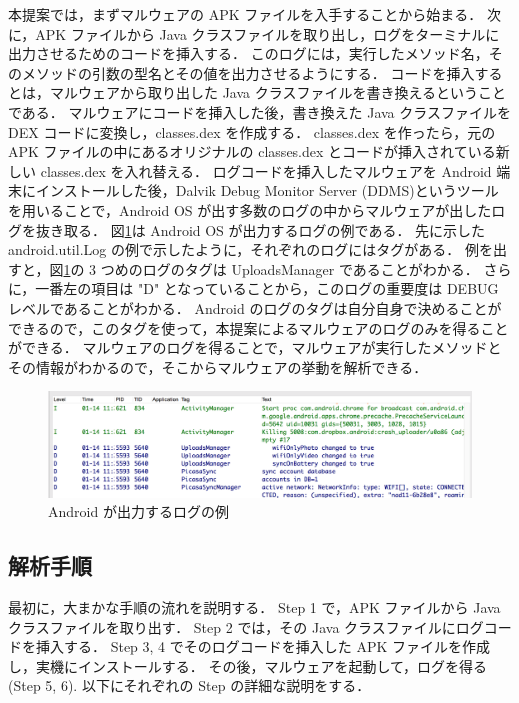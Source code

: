 本提案では，まずマルウェアの APK ファイルを入手することから始まる．
次に，APK ファイルから Java クラスファイルを取り出し，ログをターミナルに出力させるためのコードを挿入する．
このログには，実行したメソッド名，そのメソッドの引数の型名とその値を出力させるようにする．
コードを挿入するとは，マルウェアから取り出した Java クラスファイルを書き換えるということである．
マルウェアにコードを挿入した後，書き換えた Java クラスファイルを DEX コードに変換し，classes.dex を作成する．
classes.dex を作ったら，元の APK ファイルの中にあるオリジナルの classes.dex とコードが挿入されている新しい classes.dex を入れ替える．
ログコードを挿入したマルウェアを Android 端末にインストールした後，Dalvik Debug Monitor Server (DDMS)というツールを用いることで，Android OS が出す多数のログの中からマルウェアが出したログを抜き取る．
図\ref{examplelog}は Android OS が出力するログの例である．
先に示した android.util.Log の例で示したように，それぞれのログにはタグがある．
例を出すと，図\ref{examplelog}の 3 つめのログのタグは UploadsManager であることがわかる．
さらに，一番左の項目は "D"  となっていることから，このログの重要度は DEBUG レベルであることがわかる．
Android のログのタグは自分自身で決めることができるので，このタグを使って，本提案によるマルウェアのログのみを得ることができる．
マルウェアのログを得ることで，マルウェアが実行したメソッドとその情報がわかるので，そこからマルウェアの挙動を解析できる．

\begin{figure}[t]
\begin{center}
\includegraphics[scale=0.2]{androidlogexample.eps}
\end{center}
\caption{Android が出力するログの例}
\label{examplelog}
\end{figure}

\subsection{解析手順}
\label{analysismethod}
最初に，大まかな手順の流れを説明する．
Step 1 で，APK ファイルから Java クラスファイルを取り出す．
 Step 2 では，その Java クラスファイルにログコードを挿入する．
 Step 3, 4  でそのログコードを挿入した APK ファイルを作成し，実機にインストールする．
 その後，マルウェアを起動して，ログを得る (Step 5, 6). 
 以下にそれぞれの Step の詳細な説明をする．


